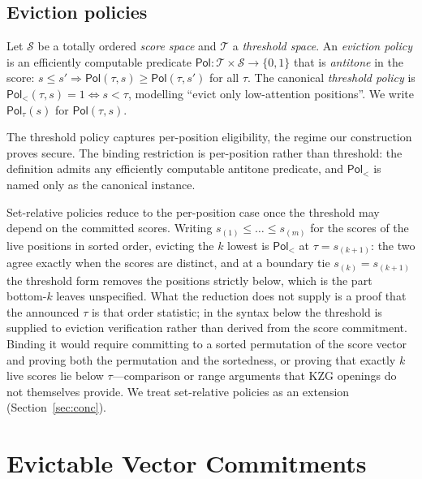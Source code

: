 \documentclass[version=preprint]{iacrcc}
\theoremstyle{definition}
\newcommand{\bit}{\{0,1\}}
\newcommand{\Pol}{\mathsf{Pol}}
\newcommand{\Ssp}{\mathcal{S}}
\newcommand{\Tsp}{\mathcal{T}}
\begin{document}
\subsection{Eviction policies}

\begin{definition}\label{def:policy}
Let $\Ssp$ be a totally ordered \emph{score space} and $\Tsp$ a \emph{threshold
space}. An \emph{eviction policy} is an efficiently computable predicate
$\Pol:\Tsp\times\Ssp\to\bit$ that is \emph{antitone} in the score:
$s\le s'\Rightarrow\Pol(\tau,s)\ge\Pol(\tau,s')$ for all $\tau$. The canonical
\emph{threshold policy} is $\Pol_{<}(\tau,s)=1\iff s<\tau$, modelling ``evict
only low-attention positions''. We write $\Pol_\tau(s)$ for $\Pol(\tau,s)$.
\end{definition}

\begin{remark}
The threshold policy captures per-position eligibility, the regime our
construction proves secure. The binding restriction is per-position rather than
threshold: the definition admits any efficiently computable antitone predicate,
and $\Pol_{<}$ is named only as the canonical instance.

Set-relative policies reduce to the per-position case once the threshold may
depend on the committed scores. Writing $s_{(1)}\le\dots\le s_{(m)}$ for the
scores of the live positions in sorted order, evicting the $k$ lowest is
$\Pol_{<}$ at $\tau=s_{(k+1)}$: the two agree exactly when the scores are
distinct, and at a boundary tie $s_{(k)}=s_{(k+1)}$ the threshold form removes
the positions strictly below, which is the part bottom-$k$ leaves unspecified.
What the reduction does not supply is a proof that the announced $\tau$ is that
order statistic; in the syntax below the threshold is supplied to eviction
verification rather than derived from the score commitment. Binding it would
require committing to a sorted permutation of the score vector and proving both
the permutation and the sortedness, or proving that exactly $k$ live scores lie
below $\tau$---comparison or range arguments that KZG openings do not
themselves provide. We treat set-relative policies as an extension
(Section~\ref{sec:conc}).
\end{remark}

\section{Evictable Vector Commitments}\label{sec:syntax}
\end{document}
